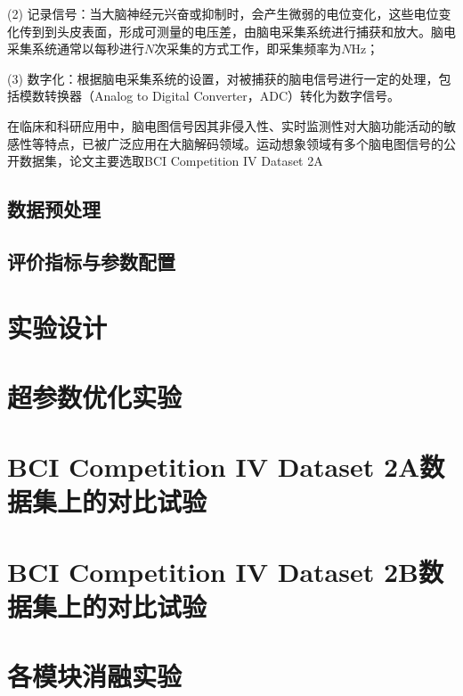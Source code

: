 (2) 记录信号：当大脑神经元兴奋或抑制时，会产生微弱的电位变化，这些电位变化传到到头皮表面，形成可测量的电压差，由脑电采集系统进行捕获和放大。脑电采集系统通常以每秒进行\(N\)次采集的方式工作，即采集频率为\(N\)Hz；

(3) 数字化：根据脑电采集系统的设置，对被捕获的脑电信号进行一定的处理，包括模数转换器（Analog to Digital Converter，ADC）转化为数字信号。

在临床和科研应用中，脑电图信号因其非侵入性、实时监测性对大脑功能活动的敏感性等特点，已被广泛应用在大脑解码领域。运动想象领域有多个脑电图信号的公开数据集，论文主要选取BCI Competition IV Dataset 2A

\subsection{数据预处理}

\subsection{评价指标与参数配置}

\section{实验设计}

\section{超参数优化实验}

\section{BCI Competition IV Dataset 2A数据集上的对比试验}

\section{BCI Competition IV Dataset 2B数据集上的对比试验}

\section{各模块消融实验}